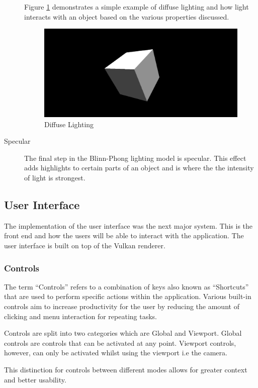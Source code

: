 \documentclass[11pt]{article}
\begin{document}
\begin{description}
    Figure \ref{fig:diffuse} demonstrates a simple example of diffuse lighting
    and how light interacts with an object based on the various properties
    discussed. 
    \begin{figure}[H]
      \centering
      \includegraphics[width=\textwidth]{images/diffuse_lighting.png}
      \caption{Diffuse Lighting}
      \label{fig:diffuse}
    \end{figure}
  \item[Specular] The final step in the Blinn-Phong lighting model is specular.
  This effect adds highlights to certain parts of an object and is where the
  the intensity of light is strongest.
\end{description}

\subsection{User Interface}
The implementation of the user interface was the next major system. This is
the front end and how the users will be able to interact with the application.
The user interface is built on top of the Vulkan renderer.

\subsubsection{Controls}
The term ``Controls'' refers to a combination of keys also known as
``Shortcuts'' that are used to perform specific actions within the application.
Various built-in controls aim to increase productivity for the user by reducing
the amount of clicking and menu interaction for repeating tasks.

Controls are split into two categories which are Global and Viewport. Global
controls are controls that can be activated at any point. Viewport controls,
however, can only be activated whilst using the viewport i.e the camera.

This distinction for controls between different modes allows for greater context
and better usability. 
\end{document}
